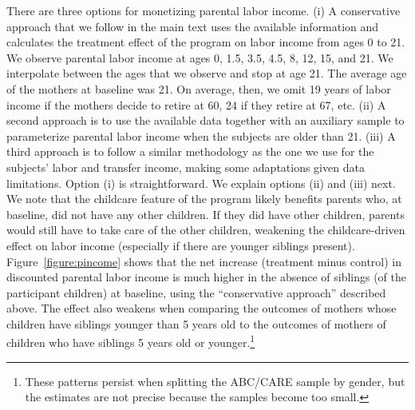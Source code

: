 \noindent There are three options for monetizing parental labor income. (i) A conservative approach that we follow in the main text uses the available information and calculates the treatment effect of the program on labor income from ages 0 to 21. We observe parental labor income at ages 0, 1.5, 3.5, 4.5, 8, 12, 15, and 21. We interpolate between the ages that we observe and stop at age 21. The average age of the mothers at baseline was 21. On average, then, we omit 19 years of labor income if the mothers decide to retire at 60, 24 if they retire at 67, etc. (ii) A second approach is to use the available data together with an auxiliary sample to parameterize parental labor income when the subjects are older than 21. (iii) A third approach is to follow a similar methodology as the one we use for the subjects' labor and transfer income, making some adaptations given data limitations. Option (i) is straightforward. We explain options (ii) and (iii) next.\\

\noindent We note that the childcare feature of the program likely benefits parents who, at baseline, did not have any other children. If they did have other children, parents would still have to take care of the other children, weakening the childcare-driven effect on labor income (especially if there are younger siblings present). Figure~\ref{figure:pincome} shows that the net increase (treatment minus control) in discounted parental labor income is much higher in the absence of siblings (of the participant children) at baseline, using the ``conservative approach'' described above. The effect also weakens when comparing the outcomes of mothers whose children have siblings younger than 5 years old to the outcomes of mothers of children who have siblings 5 years old or younger.\footnote{These patterns persist when splitting the ABC/CARE sample by gender, but the estimates are not precise because the samples become too small.}

